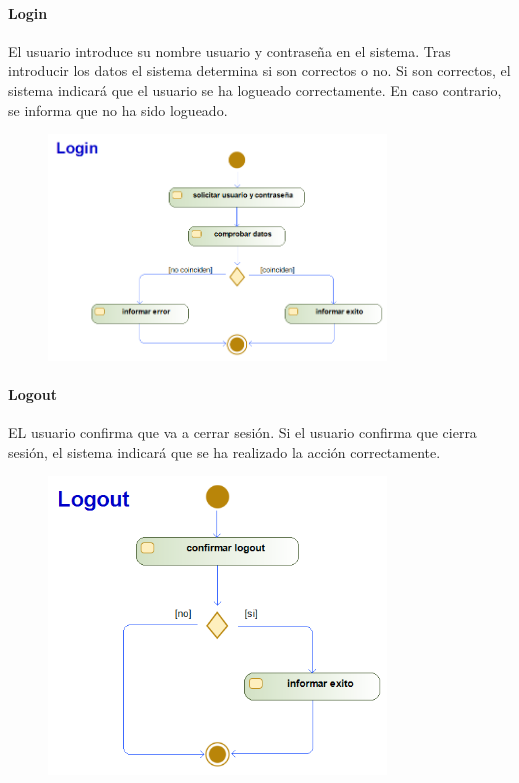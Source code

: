 \paragraph{Login}
El usuario introduce su nombre usuario y contraseña en el sistema. Tras introducir los datos el sistema determina si son correctos o no. Si son correctos, el sistema indicará que el usuario se ha logueado correctamente. En caso contrario, se informa que no ha sido logueado.
\begin{figure}[H]
    \centering
    \includegraphics[width=0.8\textwidth]{Use_Cases/login.png}
\end{figure}
\paragraph{Logout}
EL usuario confirma que va a cerrar sesión. Si el usuario confirma que cierra sesión, el sistema indicará que se ha realizado la acción correctamente.
\begin{figure}[H]
    \centering
    \includegraphics[width=0.8\textwidth]{Use_Cases/Logout.png}
\end{figure}
